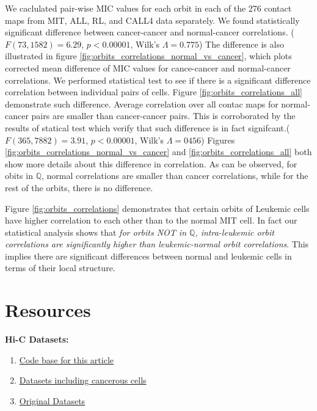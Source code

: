 \documentclass[a4,center,fleqn]{NAR}
\begin{document}
We caclulated pair-wise MIC values 
for each orbit in each of the 276
contact maps from MIT, ALL, RL, and CALL4 data separately. 
We found statistically significant difference between
cancer-cancer and normal-cancer correlations.
($F(73, 1582)=6.29$, $p < 0.00001$, Wilk's $\Lambda = 0.775$)
 The difference  is also illustrated in figure
\ref{fig:orbits_correlations_normal_vs_cancer},
which plots corrected
mean difference of MIC values for cance-cancer and 
normal-cancer correlations.  
We performed statistical test to see if there is a 
significant difference correlation between individual pairs
of cells. Figure \ref{fig:orbits_correlations_all} demonstrate
such difference.
Average correlation over all contac maps
for normal-cancer pairs are smaller
than cancer-cancer pairs. This is corroborated
by the results of statical test which verify that such difference
is in fact signifcant.($F(365, 7882) = 3.91$, $p < 0.00001$, 
Wilk's $\Lambda = 0456$)
Figures \ref{fig:orbits_correlations_normal_vs_cancer} and
\ref{fig:orbits_correlations_all} both show more details about
this difference in correlation. As can be observed, for obits
in $\mathbb{Q}$, normal correlations are smaller than cancer
correlations, while for the rest of the orbits, there is no
difference.

Figure \ref{fig:orbits_correlations} demonstrates that certain
orbits of Leukemic cells
have higher correlation to each other 
than to the
normal MIT cell. In fact our statistical analysis shows that 
\textit {for orbits NOT in $\mathbb{Q}$, 
intra-leukemic orbit correlations are significantly higher
than leukemic-normal orbit correlations}. This implies
there are significant differences between normal and
leukemic cells in terms of their local structure.


\section{Resources}
\textbf{Hi-C Datasets:}
\begin{enumerate}
    \item \href{https://github.com/rasoolianbehnam/watson}{Code base for this article}
    \item \href{http://sysbio.rnet.missouri.edu/T0510/tmp_download/link_to_download_genome_data/}
        {Datasets including cancerous cells}
    \item \href{https://bcm.app.box.com/v/aidenlab/folder/11234760671}{Original Datasets}
\end{enumerate}



\end{document}
